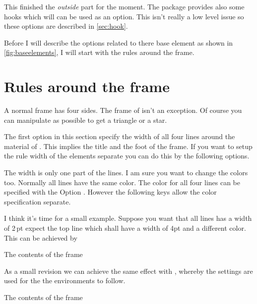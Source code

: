 \documentclass[openany,12pt,tocdepth=3]{ltx-md}
\begin{document}
\vspace*{\baselineskip}
This finished the \emph{outside} part for the moment. The package provides also some hooks
which will can be used as an option. This isn't really a low level issue so these
options are described in \autoref{sec:hook}. 

\vspace*{\baselineskip}
Before I will describe the options related to there base element as shown in \autoref{fig:baseelements}, 
I will start with the rules around the frame.

\section{Rules around the frame}\label{sec:lines}
A normal frame has four sides. The frame of  isn't an exception. Of course
you can manipulate as possible to get a triangle or a star.

The first option in this section specify the width of all four lines around the material of .
This implies the title and the foot of the frame. If you want to setup the rule width of the elements
separate you can do this by the following options.


The width is only one part of the lines. I am sure you want to change the colors too. 
Normally all lines have the same color. The color for all four lines can be specified 
with the Option . However the following keys allow the color
specification separate.


I think it's time for a small example. Suppose you want that all lines has a width of
2\,pt expect the top line which shall have a width of 4pt and a different color.
This can be achieved by
\begin{ltxexample}[caption=Example outer part,label=outer,result=true,]
 \begin{xframed}[line-width=2pt,line-width-top=4pt,
          line-color-top=blue]
   The contents of the frame
 \end{xframed}
\end{ltxexample}
As a small revision we can achieve the same effect with , 
whereby the settings are used for the the environments  to follow.
\begin{ltxexample}[caption={Example outer part II},]
 \xframedsetup[line-width=2pt,line-width-top=4pt
           ,line-color-top=blue]
 \begin{xframed}
   The contents of the frame
 \end{xframed}
\end{ltxexample}
\end{document}
